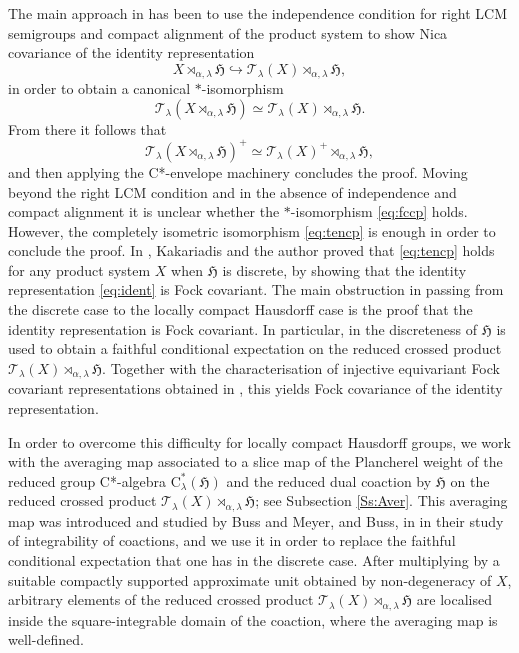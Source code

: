 \documentclass[11pt,final]{amsart}
\numberwithin{equation}{section}
\theoremstyle{plain}
\theoremstyle{definition}
\theoremstyle{remark}
\newcommand{\T}{{\mathcal{T}}}
\def\al{\alpha}
\def\la{\lambda}
\newcommand{\fH}{{\mathfrak{H}}}
\newcommand{\ca}{\mathrm{C}^*}
\begin{document}
The main approach in \cite{DKKLL22, DK20, Kat20} has been to use the independence condition for right LCM semigroups and compact alignment of the product system to show Nica covariance of the identity representation 
\begin{equation}\label{eq:ident}
X \rtimes_{\al, \la} \fH \hookrightarrow \T_\la(X) \rtimes_{\al, \la} \fH,
\end{equation}
in order to obtain a canonical $*$-isomorphism
\begin{equation}\label{eq:fccp}
\T_\la(X \rtimes_{\al, \la} \fH) \simeq \T_\la(X) \rtimes_{\al, \la} \fH.
\end{equation}
From there it follows that
\begin{equation}\label{eq:tencp}
\T_\la(X \rtimes_{\al, \la} \fH)^+ \simeq \T_\la(X)^+ \rtimes_{\al, \la} \fH,
\end{equation}
and then applying the C*-envelope machinery concludes the proof. Moving beyond the right LCM condition and in the absence of independence and compact alignment it is unclear whether the $*$-isomorphism \eqref{eq:fccp} holds. However, the completely isometric isomorphism \eqref{eq:tencp} is enough in order to conclude the proof.
In \cite{KP25}, Kakariadis and the author proved that \eqref{eq:tencp}
holds for any product system $X$ when $\fH$ is discrete, by showing that the identity representation
\eqref{eq:ident} is Fock covariant. The main obstruction in passing from the discrete case
to the locally compact Hausdorff case is the proof that the identity representation is
Fock covariant. In particular, in \cite{KP25} the discreteness of $\fH$ is used
to obtain a faithful conditional expectation on the reduced crossed product
$\T_\la(X)\rtimes_{\al,\la}\fH$. Together with the characterisation of
injective equivariant Fock covariant representations obtained in \cite{KP25}, this
yields Fock covariance of the identity representation.

In order to overcome this difficulty for locally compact Hausdorff groups, we work with the averaging map associated to a slice map of the Plancherel weight of the reduced group C*-algebra $\ca_\la(\fH)$ and the reduced dual coaction by $\fH$ on the reduced crossed product $\T_\la(X)\rtimes_{\al,\la}\fH$; see Subsection \ref{Ss:Aver}. This averaging map was introduced and studied by Buss and Meyer, and Buss, in \cite{BM09,Bus10} in their study of integrability of coactions, and we use it in order to replace the faithful conditional expectation that one has in the discrete case.  After multiplying by a suitable compactly supported approximate unit obtained by non-degeneracy of $X$, arbitrary elements of the reduced crossed product $\T_\la(X)\rtimes_{\al,\la}\fH$ are localised inside the square-integrable domain of the coaction, where the averaging map is well-defined.
\end{document}
